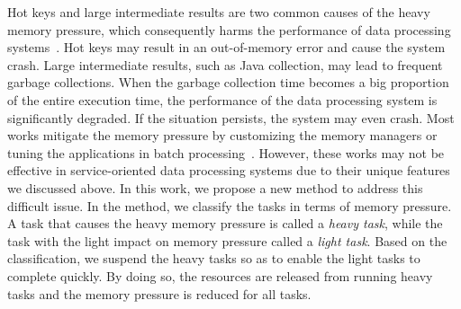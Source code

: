 Hot keys and large intermediate results are two common causes of the heavy memory pressure, which consequently harms the performance of data processing systems~\cite{fang2015interruptible}. Hot keys may result in an out-of-memory error and cause the system crash. Large intermediate results, such as Java collection, may lead to frequent garbage collections. When the garbage collection time becomes a big proportion of the entire execution time, the performance of the data processing system is significantly degraded. If the situation persists, the system may even crash. Most works mitigate the memory pressure by customizing the memory managers or tuning the applications in batch processing~\cite{www:spark-tuning, nguyen2015facade, fang2015interruptible, lulu:deca, nguyen:yak}. However, these works may not be effective in service-oriented data processing systems due to their unique features we discussed above. In this work, we propose a new method to address this difficult issue. In the method, we classify the tasks in terms of memory pressure. A task that causes the heavy memory pressure is called a \textit{heavy task}, while the task with the light impact on memory pressure called a \textit{light task}. Based on the classification, we suspend the heavy tasks so as to enable the light tasks to complete quickly. By doing so, the resources are released from running heavy tasks and the memory pressure is reduced for all tasks.


